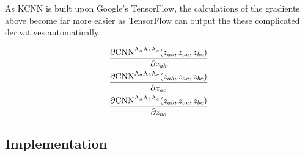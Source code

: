 \documentclass{article}
\begin{document}
As KCNN is built upon Google's TensorFlow, the calculations of the gradients above become far 
more easier as TensorFlow can output the these complicated derivatives automatically:

\begin{eqnarray}
\frac{\partial{
	\boldmath{\mathrm{CNN}}^{\mathrm{A}_{a}\mathrm{A}_{b}\mathrm{A}_{c}}
	(z_{ab}, z_{ac}, z_{bc})}
}{
	\partial{z_{ab}}
} \nonumber \\	
\frac{\partial{
	\boldmath{\mathrm{CNN}}^{\mathrm{A}_{a}\mathrm{A}_{b}\mathrm{A}_{c}}
	(z_{ab}, z_{ac}, z_{bc})}
}{
	\partial{z_{ac}}
} \nonumber \\
\frac{\partial{
	\boldmath{\mathrm{CNN}}^{\mathrm{A}_{a}\mathrm{A}_{b}\mathrm{A}_{c}}
	(z_{ab}, z_{ac}, z_{bc})}
}{
	\partial{z_{bc}}
} \nonumber
\end{eqnarray}

\subsection{Implementation}
\end{document}

